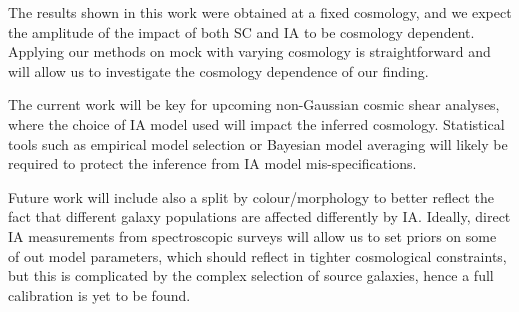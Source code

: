 The results shown in this work were obtained at a fixed cosmology, and we expect the amplitude of the impact of both SC and IA to be cosmology dependent. Applying our methods on mock with varying cosmology is straightforward and will allow us to investigate the cosmology dependence of our finding.

The current work will be key for upcoming non-Gaussian cosmic shear analyses, where the choice of IA model used will impact the inferred cosmology. Statistical tools such as empirical model selection \citep{Campos_Samuroff_IA} or Bayesian model averaging \citet{Grandon2024} will likely be required to protect the inference from IA model mis-specifications. 

Future work will include also a split by colour/morphology to better reflect the fact that different galaxy populations are affected differently by IA. Ideally, direct IA measurements from spectroscopic surveys \citep{IA_direct} will allow us to set priors on some of out model parameters, which should reflect in tighter cosmological constraints, but this is complicated by the complex selection of source galaxies, hence a full calibration is yet to be found.
